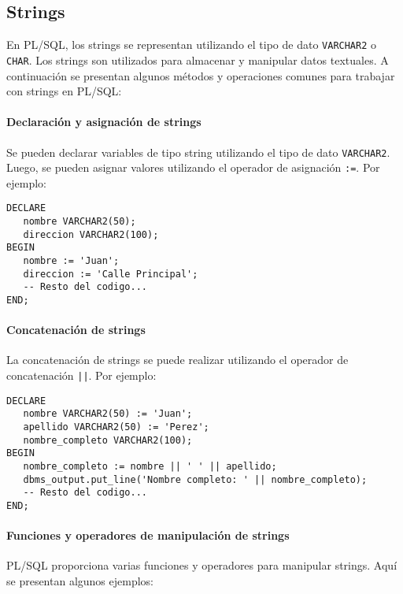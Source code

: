 \documentclass[executivepaper]{article}
\begin{document}
\subsection{Strings}

En PL/SQL, los strings se representan utilizando el tipo de dato \texttt{VARCHAR2} o \texttt{CHAR}. Los strings son utilizados para almacenar y manipular datos textuales. A continuación se presentan algunos métodos y operaciones comunes para trabajar con strings en PL/SQL:

\paragraph{Declaración y asignación de strings}

Se pueden declarar variables de tipo string utilizando el tipo de dato \texttt{VARCHAR2}. Luego, se pueden asignar valores utilizando el operador de asignación \texttt{:=}. Por ejemplo:

\begin{lstlisting}
DECLARE
   nombre VARCHAR2(50);
   direccion VARCHAR2(100);
BEGIN
   nombre := 'Juan';
   direccion := 'Calle Principal';
   -- Resto del codigo...
END;
\end{lstlisting}

\paragraph{Concatenación de strings}

La concatenación de strings se puede realizar utilizando el operador de concatenación \texttt{||}. Por ejemplo:

\begin{lstlisting}
DECLARE
   nombre VARCHAR2(50) := 'Juan';
   apellido VARCHAR2(50) := 'Perez';
   nombre_completo VARCHAR2(100);
BEGIN
   nombre_completo := nombre || ' ' || apellido;
   dbms_output.put_line('Nombre completo: ' || nombre_completo);
   -- Resto del codigo...
END;
\end{lstlisting}

\paragraph{Funciones y operadores de manipulación de strings}

PL/SQL proporciona varias funciones y operadores para manipular strings. Aquí se presentan algunos ejemplos:
\end{document}
